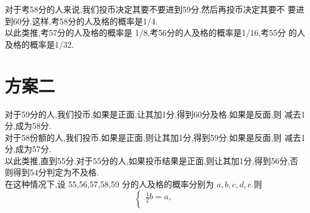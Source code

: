 \documentclass[a4paper, 12pt]{article} %
\begin{document}
\begin{CJK}{UTF8}{gkai}
  对于考58分的人来说,我们投币决定其要不要进到59分.然后再投币决定其要不
  要进到60分.这样,考58分的人及格的概率是1/4.\\

  以此类推,考57分的人及格的概率是 1/8,考56分的人及格的概率是1/16,考55分
  的人及格的概率是1/32.

\section*{方案二}
对于59分的人,我们投币.如果是正面,让其加1分,得到60分及格.如果是反面,则
减去1分,成为58分.\\

对于58份额的人,我们投币.如果是正面,则让其加1分,得到59分.如果是反面,则
减去1分,成为57分.\\

以此类推,直到55分.对于55分的人,如果投币结果是正面,则让其加1分,得到56分,否
则得到54分判定为不及格.\\

在这种情况下,设 55,56,57,58,59 分的人及格的概率分别为 $a,b,c,d,e$.则
$$
\begin{cases}
  \frac{1}{2}b=a,\\
\end{cases}
$$



  
  
  
  
  
\end{CJK}
\end{document}
